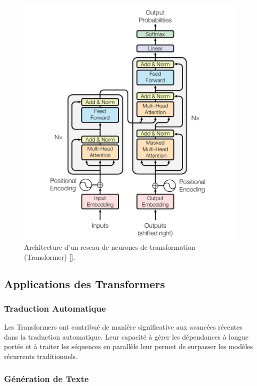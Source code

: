 \begin{figure}[hbt!]
	\centering
	\includegraphics[width=12cm]{images_pfe/transformer-architecture.png}
	\caption{Architecture d'un reseau de neurones de transformation (Transformer) [\cite{attention_is_all_you_need}].}
	\label{fig:transformer}
\end{figure}
\FloatBarrier

\subsection{Applications des Transformers}

\subsubsection{Traduction Automatique}

Les Transformers ont contribué de manière significative aux avancées récentes
dans la traduction automatique. Leur capacité à gérer les dépendances à longue
portée et à traiter les séquences en parallèle leur permet de surpasser les
modèles récurrents traditionnels.

\subsubsection{Génération de Texte}

